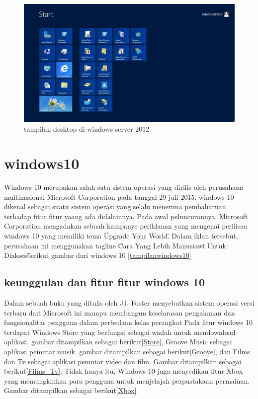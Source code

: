 \begin{figure}[ht]
\centerline{\includegraphics[width=1\textwidth]{figures/windows12.JPG}}
\caption{tampilan desktop di windows server 2012}
\label{windows12}
\end{figure}

	
	\section{windows10}
		Windows 10 merupakan salah satu sistem operasi yang dirilis oleh perusahaan multinasional Microsoft Corporation pada tanggal 29 juli 2015. windows 10 dikenal sebagai suatu sistem 
		operasi yang selalu menerima pembaharuan terhadap fitur fitur yaang ada didalamnya. Pada awal peluncurannya, Microsoft Corporation mengadakan sebuah kampanye periklanan yang 
		mengenai perilisan windows 10 yang memiliki tema \"Upgrade Your World\". Dalam iklan tersebut, perusahaan ini menggunakan tagline \"Cara Yang Lebih Manusiawi Untuk Diakses\" berikut gambar dari windows 10 \ref{tampilanwindows10}
		\subsection{keunggulan dan fitur fitur windows 10}
			Dalam sebuah buku yang ditulis oleh JJ. Foster menyebutkan sistem operasi versi terbaru dari Microsoft ini mampu membangun keselarasan pengalaman dan fungsionalitas pengguna 
			dalam perbedaan kelas perangkat \cite{foster2001data} 
			Pada fitur windows 10 terdapat Windows Store yang berfungsi sebagai wadah untuk mendownload aplikasi. gambar ditampilkan sebagai berikut\ref{Store}, Groove Music sebagai 
			aplikasi pemutar musik. gambar ditampilkan sebagai berikut\ref{Groove}, dan Films dan Tv sebagai aplikasi pemutar video dan film. Gambar ditampilkan sebagai berikut\ref{Films_Tv}. 
			Tidak hanya itu, Windows 10 juga menyedikan fitur Xbox yang memungkinkan para pengguna untuk menjelajah perpustakaan permainan. Gambar ditampilkan sebagai berikut\ref{Xbox}
